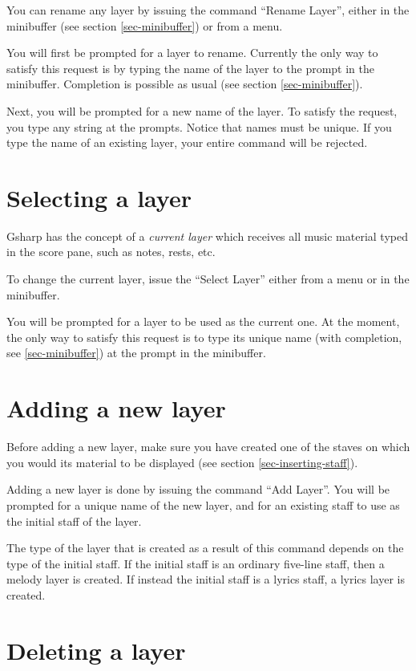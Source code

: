 \documentclass[11pt]{book}
\def\gs{Gsharp}
\def\command#1{``#1''}
\begin{document}
You can rename any layer by issuing the command \command{Rename
Layer}, either in the minibuffer (see section
\ref{sec-minibuffer}) or from a menu.

You will first be prompted for a layer to rename.  Currently the only
way to satisfy this request is by typing the name of the layer to the
prompt in the minibuffer. Completion is possible as usual (see
section \ref{sec-minibuffer}). 
 
Next, you will be prompted for a new name of the layer.  To satisfy
the request, you type any string at the prompts.  Notice that names
must be unique.  If you type the name of an existing layer, your
entire command will be rejected. 

\section{Selecting a layer}

{\gs} has the concept of a \emph{current layer}
which receives all music material typed in the score pane, such as
notes, rests, etc. 

To change the current layer, issue the \command{Select Layer} either
from a menu or in the minibuffer.  

You will be prompted for a layer to be used as the current one.  At
the moment, the only way to satisfy this request is to type its unique
name (with completion, see \ref{sec-minibuffer}) at the prompt in
the minibuffer. 

\section{Adding a new layer}

Before adding a new layer, make sure you have created one of the
staves on which you would its material to be displayed (see section
\ref{sec-inserting-staff}).  

Adding a new layer is done by issuing the command \command{Add
  Layer}.  You will be prompted for a unique name of the new layer,
and for an existing staff to use as the initial staff of the layer. 

The type of the layer that is created as a result of this command
depends on the type of the initial staff.  If the initial staff is an
ordinary five-line staff, then a melody layer is created.  If instead
the initial staff is a lyrics staff, a lyrics layer is created. 

\section{Deleting a layer}
\end{document}

